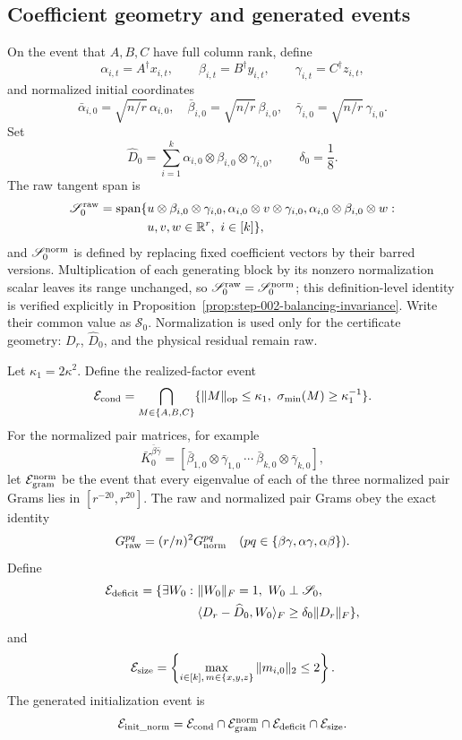 \subsection{Coefficient geometry and generated events}

On the event that $A,B,C$ have full column rank, define
\[
  \alpha_{i,t}=A^\dagger x_{i,t},\qquad
  \beta_{i,t}=B^\dagger y_{i,t},\qquad
  \gamma_{i,t}=C^\dagger z_{i,t},
\]
and normalized initial coordinates
\[
  \bar\alpha_{i,0}=\sqrt{n/r}\,\alpha_{i,0},\quad
  \bar\beta_{i,0}=\sqrt{n/r}\,\beta_{i,0},\quad
  \bar\gamma_{i,0}=\sqrt{n/r}\,\gamma_{i,0}.
\]
Set
\[
  \widehat D_0=\sum_{i=1}^k
    \alpha_{i,0}\otimes\beta_{i,0}\otimes\gamma_{i,0},
  \qquad \delta_0=\frac18.
\]
The raw tangent span is
\[
\begin{aligned}
\mathscr S_0^{\rm raw}=\operatorname{span}\{&
 u\otimes\beta_{i,0}\otimes\gamma_{i,0},
 \alpha_{i,0}\otimes v\otimes\gamma_{i,0},
 \alpha_{i,0}\otimes\beta_{i,0}\otimes w:\\
&u,v,w\in\mathbb R^r,\ i\in[k]\},
\end{aligned}
\]
and $\mathscr S_0^{\rm norm}$ is defined by replacing fixed coefficient
vectors by their barred versions.  Multiplication of each generating block by
its nonzero normalization scalar leaves its range unchanged, so
$\mathscr S_0^{\rm raw}=\mathscr S_0^{\rm norm}$; this definition-level
identity is verified explicitly in
Proposition~\ref{prop:step-002-balancing-invariance}.  Write their common
value as $\mathscr S_0$.  Normalization is used only for the certificate
geometry: $D_r$, $\widehat D_0$, and the physical residual remain raw.

Let $\kappa_1=2\kappa^2$.  Define the realized-factor event
\[
  \mathcal E_{\rm cond}=
  \bigcap_{M\in\{A,B,C\}}
  \{\|M\|_{\rm op}\le\kappa_1,
    \ \sigma_{\min}(M)\ge\kappa_1^{-1}\}.
\]
For the normalized pair matrices, for example
\[
  \bar K_0^{\bar\beta\bar\gamma}
  =[\bar\beta_{1,0}\otimes\bar\gamma_{1,0}\ \cdots\
    \bar\beta_{k,0}\otimes\bar\gamma_{k,0}],
\]
let $\mathcal E_{\rm gram}^{\rm norm}$ be the event that every eigenvalue of
each of the three normalized pair Grams lies in $[r^{-20},r^{20}]$.  The raw
and normalized pair Grams obey the exact identity
\[
  G_{\rm raw}^{pq}=(r/n)^2G_{\rm norm}^{pq}
  \quad(pq\in\{\beta\gamma,\alpha\gamma,\alpha\beta\}).
\]
Define
\[
\begin{aligned}
  \mathcal E_{\rm deficit}
  =\{\exists W_0:\ &\|W_0\|_F=1,\ W_0\perp\mathscr S_0,\\
  &\langle D_r-\widehat D_0,W_0\rangle_F
     \ge\delta_0\|D_r\|_F\},
\end{aligned}
\]
and
\[
  \mathcal E_{\rm size}
  =\left\{\max_{i\in[k],\,m\in\{x,y,z\}}\|m_{i,0}\|_2\le2\right\}.
\]
The generated initialization event is
\[
  \mathcal E_{\rm init\_norm}
  =\mathcal E_{\rm cond}\cap\mathcal E_{\rm gram}^{\rm norm}
   \cap\mathcal E_{\rm deficit}\cap\mathcal E_{\rm size}.
\]

